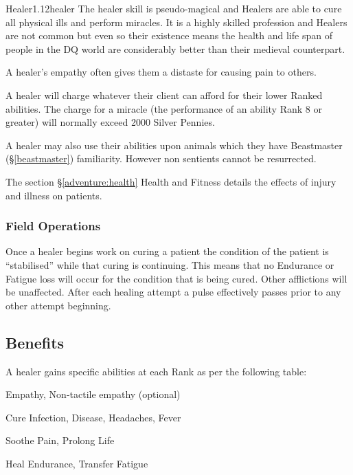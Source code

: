 \begin{skill*}{Healer}{1.12}{healer}
The healer skill is pseudo-magical and Healers are able to cure all
physical ills and perform miracles.  It is a highly skilled profession
and Healers are not common but even so their existence means the
health and life span of people in the DQ world are considerably better
than their medieval counterpart.

A healer's empathy often gives them a distaste for causing pain to
others.

A healer will charge whatever their client can afford for their lower
Ranked abilities. The charge for a miracle (the performance of an
ability Rank 8 or greater) will normally exceed 2000 Silver Pennies.

A healer may also use their abilities upon animals which they have
Beastmaster (\S\ref{beastmaster}) familiarity. However non sentients
cannot be resurrected.

The section \S\ref{adventure:health} Health and Fitness details the
effects of injury and illness on patients.

\subsubsection{Field Operations}

Once a healer begins work on curing a patient the condition of the
patient is ``stabilised'' while that curing is continuing. This means
that no Endurance or Fatigue loss will occur for the condition that is
being cured. Other afflictions will be unaffected. After each healing
attempt a pulse effectively passes prior to any other attempt
beginning.

\subsection{Benefits}

A healer gains specific abilities at each Rank as per the following
table:
\begin{Enumerate}
\setcounter{enumi}{-1}
\item
Empathy, Non-tactile empathy (optional)

\item
Cure Infection, Disease, Headaches, Fever

\item
Soothe Pain, Prolong Life

\item
Heal Endurance, Transfer Fatigue


\end{Enumerate}
\end{skill*}
